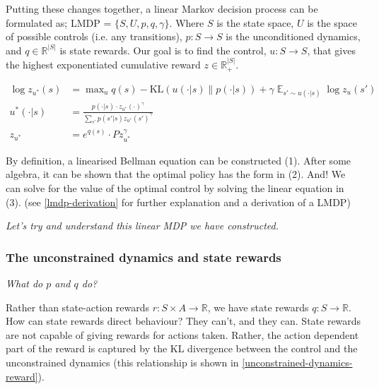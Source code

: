 

Putting these changes together, a linear Markov decision process can be formulated as;
LMDP = $\{S, U, p, q, \gamma\}$. Where $S$ is the state space, $U$ is the space of possible controls (i.e. any transitions),
$p: S \to S$ is the unconditioned dynamics, and $q \in \mathbb R^{|S|}$ is state rewards.
Our goal is to find the control, $u: S \to S$, that gives the highest exponentiated cumulative reward $z \in \mathbb R_+^{|S|}$.

\begin{align}
\log z_{u^{* }}(s) &= \mathop{\text{max}}_{u} q(s) - \text{KL}(u(\cdot| s) \parallel p(\cdot | s)) + \gamma \mathop{\mathbb E}_{s' \sim u(\cdot | s)} \log z_{u}(s') \tag{1}\\
u^{* }(\cdot | s) &= \frac{p(\cdot | s)\cdot z_{u^{* }}(\cdot)^{\gamma}}{\sum_{s'} p(s' | s) z_{u^{* }}(s')^{\gamma}} \tag{2}\\
z_{u^{* }} &= e^{q(s)}\cdot P z_{u^{* }}^{\gamma} \tag{3}
\end{align}

By definition, a linearised Bellman equation can be constructed (1). After some algebra,
it can be shown that the optimal policy has the form in (2).
And! We can solve for the value of the optimal control by solving the linear equation in (3).
(see \ref{lmdp-derivation} for further explanation and a derivation of a LMDP)

\begin{displayquote}
\textsl{Let's try and understand this linear MDP we have constructed.}
\end{displayquote}

\subsubsection{The unconstrained dynamics and state rewards}

\begin{displayquote}
\textsl{What do $p$ and $q$ do?}
\end{displayquote}

Rather than state-action rewards $r: S \times A \to \mathbb R$, we have state rewards $q: S \to \mathbb R$.
How can state rewards direct behaviour? They can't, and they can. State rewards are not capable of giving rewards for actions taken.
Rather, the action dependent part of the reward is captured by the KL divergence between
the control and the unconstrained dynamics (this relationship is shown in \ref{unconstrained-dynamics-reward}).

